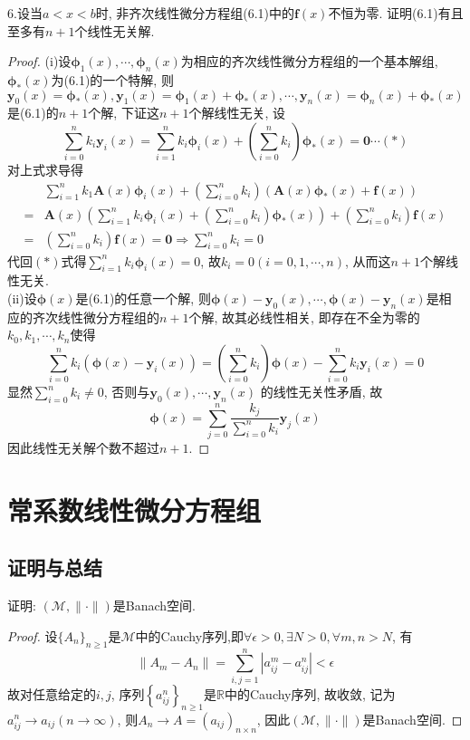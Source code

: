 6.设当$a<x<b$时, 非齐次线性微分方程组(6.1)中的$\bm{f}(x)$不恒为零. 证明(6.1)有且至多有$n+1$个线性无关解.

\begin{proof}
(i)设$\bm{\phi}_1(x),\cdots,\bm{\phi}_n(x)$为相应的齐次线性微分方程组的一个基本解组, 
$\bm{\phi}_*(x)$为(6.1)的一个特解, 
则$\bm{y}_0(x)=\bm{\phi}_*(x),\bm{y}_1(x)=\bm{\phi}_1(x)+\bm{\phi}_*(x),\cdots,\bm{y}_n(x)=\bm{\phi}_n(x)+\bm{\phi}_*(x)$
是(6.1)的$n+1$个解, 下证这$n+1$个解线性无关, 设
\[\sum_{i=0}^nk_i\bm{y}_i(x)=\sum_{i=1}^nk_i\bm{\phi}_i(x)+\left(\sum_{i=0}^nk_i\right)\bm{\phi}_*(x)=\bm{0}\cdots(*)\]
对上式求导得
\[\begin{split}
&\sum_{i=1}^nk_1\bm{A}(x)\bm{\phi}_i(x)+\left(\sum_{i=0}^nk_i\right)\left(\bm{A}(x)\bm{\phi}_*(x)+\bm{f}(x)\right)\\
=&\bm{A}(x)\left(\sum_{i=1}^nk_i\bm{\phi}_i(x)+\left(\sum_{i=0}^nk_i\right)\bm{\phi}_*(x)\right)+\left(\sum_{i=0}^nk_i\right)\bm{f}(x)\\
=&\left(\sum_{i=0}^nk_i\right)\bm{f}(x)=\bm{0}\Rightarrow\sum_{i=0}^nk_i=0
\end{split}\]
代回$(*)$式得$\sum_{i=1}^nk_i\bm{\phi}_i(x)=0$, 故$k_i=0(i=0,1,\cdots,n)$, 从而这$n+1$个解线性无关.\\
(ii)设$\bm{\phi}(x)$是(6.1)的任意一个解, 则$\bm{\phi}(x)-\bm{y}_0(x),\cdots,\bm{\phi}(x)-\bm{y}_n(x)$是相应的齐次线性微分方程组的$n+1$个解, 故其必线性相关, 即存在不全为零的$k_0,k_1,\cdots,k_n$使得
\[\sum_{i=0}^nk_i(\bm{\phi}(x)-\bm{y}_i(x))=\left(\sum_{i=0}^nk_i\right)\bm{\phi}(x)-\sum_{i=0}^nk_i\bm{y}_i(x)=0\]
显然$\sum_{i=0}^nk_i\neq0$, 否则与$\bm{y}_0(x),\cdots,\bm{y}_n(x)$ 的线性无关性矛盾, 故
\[\bm{\phi}(x)=\sum_{j=0}^n\frac{k_j}{\sum_{i=0}^nk_i}\bm{y}_j(x)\]
因此线性无关解个数不超过$n+1$.
\end{proof}


\section{常系数线性微分方程组}


\subsection{证明与总结}


证明: $(\mathcal{M},\|\cdot\|)$是Banach空间.

\begin{proof}
设$\{A_n\}_{n\geq1}$是$\mathcal{M}$中的Cauchy序列,即$\forall\epsilon>0,\exists N>0,\forall m,n>N$, 有
\[\|A_m-A_n\|=\sum_{i,j=1}^n|a_{ij}^m-a_{ij}^n|<\epsilon\]
故对任意给定的$i,j$, 序列$\left\{a_{ij}^n\right\}_{n\geq1}$是$\mathbb{R}$中的Cauchy序列, 故收敛, 记为$a_{ij}^n\to a_{ij}(n\to\infty)$, 则$A_n\to A=(a_{ij})_{n\times n}$, 因此$(\mathcal{M},\|\cdot\|)$是Banach空间.
\end{proof}

